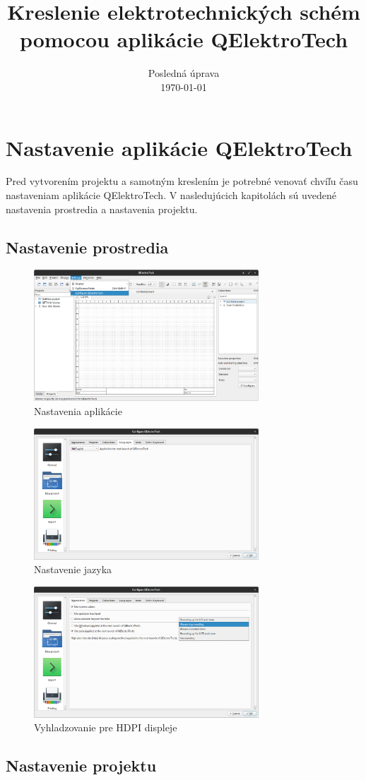 \documentclass[a4paper,titlepage,12pt]{article}
\title{\textbf{Kreslenie elektrotechnických schém pomocou aplikácie QElektroTech}}
\author{}
\date{Posledná úprava \\ \today}
\begin{document}
\maketitle
\tableofcontents
\newpage

\section{Nastavenie aplikácie QElektroTech}
Pred vytvorením projektu a samotným kreslením je potrebné venovať chvíľu času nastaveniam aplikácie QElektroTech. V nasledujúcich kapitolách sú uvedené nastavenia prostredia a nastavenia projektu.

\subsection{Nastavenie prostredia}
\begin{figure}[ht]
\centering
\includegraphics[width=0.75\textwidth]{settings-1.png}
\caption{Nastavenia aplikácie}
\label{Fig:nastavenia-aplikacie}
\end{figure}

\begin{figure}[ht]
\centering
\includegraphics[width=0.75\textwidth]{settings-2.png}
\caption{Nastavenie jazyka}
\label{Fig:nastavenie-jazyka}
\end{figure}

\begin{figure}[ht]
\centering
\includegraphics[width=0.75\textwidth]{settings-3.png}
\caption{Vyhladzovanie pre HDPI displeje}
\label{Fig:nastavenia-aplikacie}
\end{figure}

\subsection{Nastavenie projektu}
\end{document}
